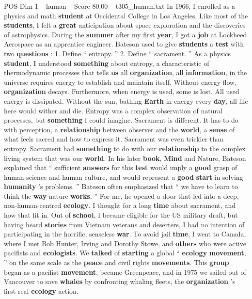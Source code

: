 \begin{textsample}{POS Dim 1 – human – Score 80.00 – t305\_human.txt}
In 1966, I enrolled as a physics and math \textbf{student} at Occidental College in Los Angeles.
Like most of the \textbf{students}, I felt a \textbf{great} anticipation about space exploration and the discoveries of astrophysics.
During the \textbf{summer} after my first \textbf{year}, I got a \textbf{job} at Lockheed Aerospace as an apprentice engineer.
Bateson used to give \textbf{students} a \textbf{test} with two \textbf{questions} : 1.
Define “ entropy. ” 2.
Define “ sacrament. ” As a physics \textbf{student}, I understood \textbf{something} about entropy, a characteristic of thermodynamic processes that tells \textbf{us} all \textbf{organization}, all \textbf{information}, in the universe requires energy to establish and maintain itself.
Without energy flow, \textbf{organization} decays.
Furthermore, when energy is used, some is lost.
All used energy is dissipated.
Without the sun, bathing \textbf{Earth} in energy every \textbf{day}, all life here would wither and die.
Entropy was a complex observation of natural processes, but \textbf{something} I could imagine.
Sacrament is different.
It has to do with perception, a \textbf{relationship} between observer and the \textbf{world}, a \textbf{sense} of what feels sacred and how to express it.
Sacrament was even trickier than entropy.
Sacrament had \textbf{something} to do with our \textbf{relationship} to the complex living system that was our \textbf{world}.
In his later \textbf{book}, \textbf{Mind} and Nature, Bateson explained that “ sufficient \textbf{answers} for this \textbf{test} would imply a \textbf{good} grasp of human science and human culture, and would represent a \textbf{good} \textbf{start} in solving \textbf{humanity} ’s problems. ” Bateson often emphasized that “ we have to learn to think the \textbf{way} nature \textbf{works}. ” For me, he opened a door that led into a deep, non-human-centred \textbf{ecology}.
I thought for a long \textbf{time} about sacrament, and how that fit in.
Out of \textbf{school}, I became eligible for the US military draft, but having heard \textbf{stories} from Vietnam veterans and deserters, I had no intention of participating in the horrific, senseless \textbf{war}.
To avoid jail \textbf{time}, I went to Canada, where I met Bob Hunter, Irving and Dorothy Stowe, and \textbf{others} who were active pacifists and \textbf{ecologists}.
We \textbf{talked} of \textbf{starting} a global “ \textbf{ecology} \textbf{movement}, ” on the same scale as the \textbf{peace} and civil rights \textbf{movements}.
This \textbf{group} began as a pacifist \textbf{movement}, became Greenpeace, and in 1975 we sailed out of Vancouver to save \textbf{whales} by confronting whaling fleets, the \textbf{organization} ’s first real \textbf{ecology} action.

\end{textsample}
